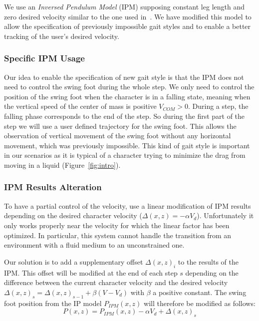 \documentclass[conference]{acmsiggraph}
\begin{document}
We use an \textit{Inversed Pendulum Model} (IPM) supposing constant leg length and zero desired velocity similar to the one used in~\cite{coros2010generalized}. We have modified this model to allow the specification of previously impossible gait styles and to enable a better tracking of the user's desired velocity. 

\subsubsection{Specific IPM Usage}
\label{sec:specific_ipm}

Our idea to enable the specification of new gait style is that the IPM does not need to control the swing foot during the whole step. We only need to control the position of the swing foot when the character is in a falling state, meaning when the vertical speed of the center of mass is positive $V_{COM}>0$. During a step, the falling phase corresponds to the end of the step. So during the first part of the step we will use a user defined trajectory for the swing foot. This allows the observation of vertical movement of the swing foot without any horizontal movement, which was previously impossible. This kind of gait style is important in our scenarios as it is typical of a character trying to minimize the drag from moving in a liquid (Figure~\ref{fig:intro}).

\subsubsection{IPM Results Alteration}
\label{sec:ipm_alt}

To have a partial control of the velocity, \cite{coros2010generalized} use a linear modification of IPM results depending on the desired character velocity ($\Delta(x,z)=-\alpha V_d$). Unfortunately it only works properly near the velocity for which the linear factor has been optimized. In particular, this system cannot handle the transition from an environment with a fluid medium to an unconstrained one.

Our solution is to add a supplementary offset $\Delta(x,z)_i$ to the results of the IPM. This offset will be modified at the end of each step $s$ depending on the difference between the current character velocity and the desired velocity $\Delta(x,z)_s = \Delta(x,z)_{s-1}+\beta(V-V_d)$ with $\beta$ a positive constant. The swing foot position from the IP model $P_{IPM}(x,z)$ will therefore be modified as follows:
$$
P(x,z) = P_{IPM}(x,z) - \alpha V_d + \Delta(x,z)_s
$$ 
\end{document}
